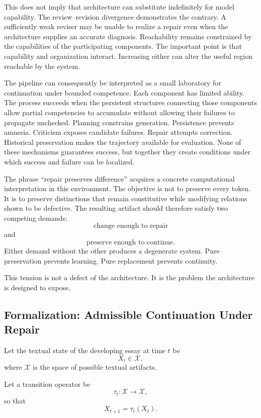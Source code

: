 \documentclass[11pt]{article}
\begin{document}
This does not imply that architecture can substitute indefinitely for model capability. The review--revision divergence demonstrates the contrary. A sufficiently weak reviser may be unable to realize a repair even when the architecture supplies an accurate diagnosis. Reachability remains constrained by the capabilities of the participating components. The important point is that capability and organization interact. Increasing either can alter the useful region reachable by the system.

The pipeline can consequently be interpreted as a small laboratory for continuation under bounded competence. Each component has limited ability. The process succeeds when the persistent structures connecting those components allow partial competencies to accumulate without allowing their failures to propagate unchecked. Planning constrains generation. Persistence prevents amnesia. Criticism exposes candidate failures. Repair attempts correction. Historical preservation makes the trajectory available for evaluation. None of these mechanisms guarantees success, but together they create conditions under which success and failure can be localized.

The phrase ``repair preserves difference'' acquires a concrete computational interpretation in this environment. The objective is not to preserve every token. It is to preserve distinctions that remain constitutive while modifying relations shown to be defective. The resulting artifact should therefore satisfy two competing demands:
\[
    \text{change enough to repair}
\]
and
\[
    \text{preserve enough to continue}.
\]
Either demand without the other produces a degenerate system. Pure preservation prevents learning. Pure replacement prevents continuity.

This tension is not a defect of the architecture. It is the problem the architecture is designed to expose.

\subsection{Formalization: Admissible Continuation Under Repair}

Let the textual state of the developing essay at time \(t\) be
\[
    X_t\in\mathcal{X},
\]
where \(\mathcal{X}\) is the space of possible textual artifacts.

Let a transition operator be
\[
    \tau_t:
    \mathcal{X}
    \rightarrow
    \mathcal{X},
\]
so that
\[
    X_{t+1}
    =
    \tau_t(X_t).
\]
\end{document}
